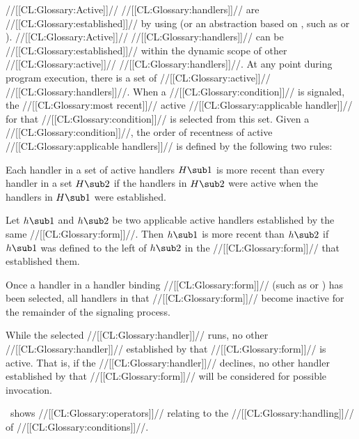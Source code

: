 //[[CL:Glossary:Active]]// //[[CL:Glossary:handlers]]// are //[[CL:Glossary:established]]// by using   (or an abstraction based on ,  such as  or ).
  //[[CL:Glossary:Active]]// //[[CL:Glossary:handlers]]// can be //[[CL:Glossary:established]]// within the dynamic scope of other //[[CL:Glossary:active]]// //[[CL:Glossary:handlers]]//. At any point during program execution, there is a set of //[[CL:Glossary:active]]// //[[CL:Glossary:handlers]]//. When a //[[CL:Glossary:condition]]// is signaled, the //[[CL:Glossary:most recent]]// active //[[CL:Glossary:applicable handler]]// for that //[[CL:Glossary:condition]]// is selected from this set. Given a //[[CL:Glossary:condition]]//, the order of recentness of  active //[[CL:Glossary:applicable handlers]]// is defined by the following two rules:
  \beginlist
 
  Each handler in a set of active handlers $H\sub 1$ is more recent than every handler in a set $H\sub 2$ if the handlers in $H\sub 2$ were active when the handlers in $H\sub 1$ were established.
 
  Let $h\sub 1$ and $h\sub 2$ be two applicable active handlers established by the same //[[CL:Glossary:form]]//. Then $h\sub 1$ is more recent than $h\sub 2$ if $h\sub 1$ was defined to the left of $h\sub 2$ in the //[[CL:Glossary:form]]// that established them.
  \endlist
 

Once a handler in a handler binding //[[CL:Glossary:form]]// (such as   or ) has been selected, all handlers in that //[[CL:Glossary:form]]// become inactive for  the remainder of the signaling process.

While the selected //[[CL:Glossary:handler]]// runs, no other //[[CL:Glossary:handler]]// established by that //[[CL:Glossary:form]]// is active. That is, if the //[[CL:Glossary:handler]]// declines,  no other handler established by that //[[CL:Glossary:form]]// will be considered for possible invocation.

\Thenextfigure\ shows //[[CL:Glossary:operators]]// relating to  the //[[CL:Glossary:handling]]// of //[[CL:Glossary:conditions]]//.

